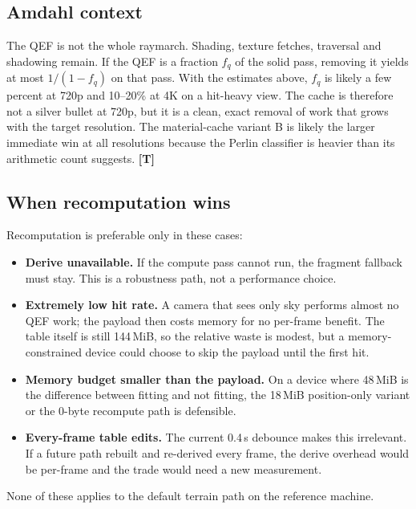 \documentclass[11pt,a4paper]{article}
\newcommand{\evT}{\textsf{\textbf{\color{evT}[T]}}}
\theoremstyle{plain}
\theoremstyle{definition}
\theoremstyle{remark}
\begin{document}
\subsection{Amdahl context}

The QEF is not the whole raymarch. Shading, texture fetches, traversal and
shadowing remain. If the QEF is a fraction $f_q$ of the solid pass, removing
it yields at most $1/(1-f_q)$ on that pass. With the estimates above, $f_q$ is
likely a few percent at 720p and 10--20\% at 4K on a hit-heavy view. The
cache is therefore not a silver bullet at 720p, but it is a clean, exact
removal of work that grows with the target resolution. The material-cache
variant B is likely the larger immediate win at all resolutions because the
Perlin classifier is heavier than its arithmetic count suggests. \evT

\subsection{When recomputation wins}

Recomputation is preferable only in these cases:
\begin{itemize}[leftmargin=1.3em,itemsep=1pt]
\item \textbf{Derive unavailable.} If the compute pass cannot run, the
      fragment fallback must stay. This is a robustness path, not a
      performance choice.
\item \textbf{Extremely low hit rate.} A camera that sees only sky performs
      almost no QEF work; the payload then costs memory for no per-frame
      benefit. The table itself is still 144\,MiB, so the relative waste is
      modest, but a memory-constrained device could choose to skip the
      payload until the first hit.
\item \textbf{Memory budget smaller than the payload.} On a device where
      48\,MiB is the difference between fitting and not fitting, the 18\,MiB
      position-only variant or the 0-byte recompute path is defensible.
\item \textbf{Every-frame table edits.} The current 0.4\,s debounce makes this
      irrelevant. If a future path rebuilt and re-derived every frame, the
      derive overhead would be per-frame and the trade would need a new
      measurement.
\end{itemize}
None of these applies to the default terrain path on the reference machine.

\end{document}
